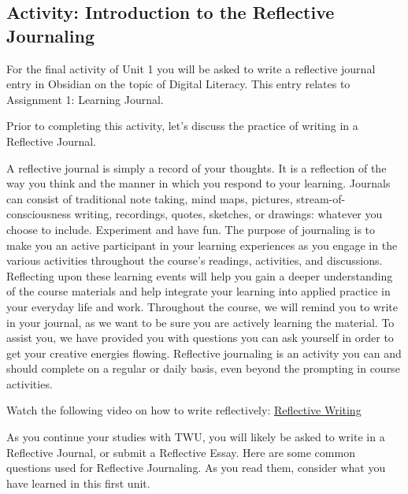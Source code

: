 \documentclass[
]{book}
\theoremstyle{definition}
\theoremstyle{definition}
\theoremstyle{definition}
\theoremstyle{definition}
\theoremstyle{remark}
\begin{document}
\hypertarget{activity-introduction-to-the-reflective-journaling}{%
\subsection*{Activity: Introduction to the Reflective Journaling}\label{activity-introduction-to-the-reflective-journaling}}

\begin{reflect}
For the final activity of Unit 1 you will be asked to write a reflective journal entry in Obsidian on the topic of Digital Literacy. This entry relates to Assignment 1: Learning Journal.

Prior to completing this activity, let's discuss the practice of writing in a Reflective Journal.

A reflective journal is simply a record of your thoughts. It is a reflection of the way you think and the manner in which you respond to your learning. Journals can consist of traditional note taking, mind maps, pictures, stream-of-consciousness writing, recordings, quotes, sketches, or drawings: whatever you choose to include. Experiment and have fun. The purpose of journaling is to make you an active participant in your learning experiences as you engage in the various activities throughout the course's readings, activities, and discussions. Reflecting upon these learning events will help you gain a deeper understanding of the course materials and help integrate your learning into applied practice in your everyday life and work. Throughout the course, we will remind you to write in your journal, as we want to be sure you are actively learning the material. To assist you, we have provided you with questions you can ask yourself in order to get your creative energies flowing. Reflective journaling is an activity you can and should complete on a regular or daily basis, even beyond the prompting in course activities.

Watch the following video on how to write reflectively: \href{https://www.youtube.com/watch?v=QoI67VeE3ds}{Reflective Writing}

As you continue your studies with TWU, you will likely be asked to write in a Reflective Journal, or submit a Reflective Essay. Here are some common questions used for Reflective Journaling. As you read them, consider what you have learned in this first unit.


\end{reflect}
\end{document}
